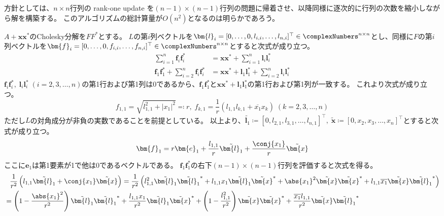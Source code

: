         \begin{derivation*}
            方針としては、$n\times n$行列の rank-one update を$(n-1)\times(n-1)$行列の問題に帰着させ、以降同様に逐次的に行列の次数を縮小しながら解を構築する。
            このアルゴリズムの総計算量が$O(n^2)$となるのは明らかであろう。
            \par
            $A+\bm{x}\bm{x}^*$のCholesky分解を$FF^*$とする。
            $L$の第$i$列ベクトルを$\bm{l}_i = [0,\dots,0,l_{i,i},\dots,l_{n,i}]^\top\in\complexNumbers^{n\times n}$とし、同様に$F$の第$i$列ベクトルを$\bm{f}_i = [0,\dots,0,f_{i,i},\dots,f_{n,i}]^\top\in\complexNumbers^{n\times n}$とすると次式が成り立つ。
            \begin{align*}
                \sum_{i=1}^n \bm{f}_i\bm{f}_i^* &= \bm{x}\bm{x}^* + \sum_{i=1}^n \bm{l}_i\bm{l}_i^* \\
                \bm{f}_1\bm{f}_1^* + \sum_{i=2}^n \bm{f}_i\bm{f}_i^* &= \bm{x}\bm{x}^* + \bm{l}_1\bm{l}_1^* + \sum_{i=2}^n \bm{l}_i\bm{l}_i^* \tag{1}
            \end{align*}
            $\bm{f}_i\bm{f}_i^*,\;\bm{l}_i\bm{l}_i^*\;(i=2,3,\dots,n)$の第1行および第1列は0であるから、$\bm{f}_1\bm{f}_1^*$と$\bm{x}\bm{x}^* + \bm{l}_1\bm{l}_1^*$の第1行および第1列が一致する。
            これより次式が成り立つ。
            \[ f_{1,1} = \sqrt{l_{1,1}^2 + |x_1|^2} \eqqcolon r,\; f_{k,1} = \frac{1}{r}\left(l_{1,1}l_{k,1} + \overline{x_1}x_k\right) \; (k=2,3,\dots,n) \tag{2} \]
            ただし$L$の対角成分が非負の実数であることを前提としている。
            以上より、$\tilde{\bm{l}_1} \coloneq [0,l_{2,1},l_{3,1},\dots,l_{n,1}]^\top,\;\tilde{\bm{x}} \coloneq [0,x_2,x_3,\dots,x_n]^\top$とすると次式が成り立つ。
            \[ \bm{f}_1 = r\bm{e}_1 + \frac{l_{1,1}}{r}\tilde{\bm{l}_1} + \frac{\conj{x_1}}{r}\tilde{\bm{x}} \]
            ここに$\bm{e}_1$は第1要素が1で他は0であるベクトルである。
            $\bm{f}_1\bm{f}_1^*$の右下$(n-1)\times(n-1)$行列を評価すると次式を得る。
            \begin{align*}
                &\phantom{=} \frac{1}{r^2}\left(l_{1,1}\tilde{\bm{l}_1} + \conj{x_1}\tilde{\bm{x}}\right) = \frac{1}{r^2} \left(l_{1,1}^2\tilde{\bm{l}_1}\tilde{\bm{l}_1}^* + l_{1,1}x_1\tilde{\bm{l}_1}\tilde{\bm{x}}^* + \abs{x_1}^2\tilde{\bm{x}}\tilde{\bm{x}}^* + l_{1,1}\overline{x_1}\tilde{\bm{x}}\tilde{\bm{l}_1}^*\right) \\
                &= \left(1 - \frac{\abs{x_1}^2}{r^2}\right)\tilde{\bm{l}_1}\tilde{\bm{l}_1}^* + \frac{l_{1,1}x_1}{r^2}\tilde{\bm{l}_1}\tilde{\bm{x}}^* + \left(1 - \frac{l_{1,1}^2}{r^2}\right)\tilde{\bm{x}}\tilde{\bm{x}}^* + \frac{\overline{x_1}l_{1,1}}{r^2}\tilde{\bm{x}}\tilde{\bm{l}_1}^* \\

\end{align*}
\end{derivation*}
